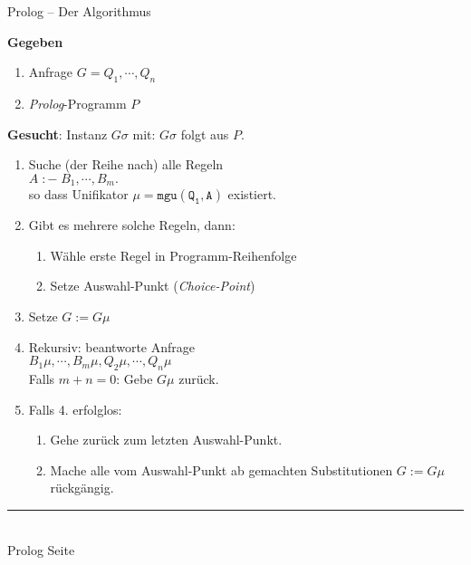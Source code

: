 \documentclass{slides}
\newcommand{\myrule}{\rule{20cm}{1mm}\\ }
\newcounter{mypage}
\begin{document}

\begin{slide}{}
\normalsize
\begin{center}
Prolog -- Der Algorithmus
\end{center}

\footnotesize
\textbf{Gegeben}
\begin{enumerate}
\item Anfrage \hspace*{3.5cm} $G = Q_1, \cdots, Q_n$
\item \textsl{Prolog}-Programm \quad $P$
\end{enumerate}

\textbf{Gesucht}: Instanz $G\sigma$ mit: \quad $G\sigma$ folgt aus $P$.
\begin{enumerate}
\item Suche (der Reihe nach) alle Regeln  \\[0.3cm]      
      \hspace*{1.3cm} $A \;\mathtt{:-}\; B_1,\cdots,B_m.$ \\[0.3cm]
      so dass Unifikator $\mu = \mathtt{mgu(Q_1,A)}$ existiert.
\item Gibt es mehrere solche Regeln, dann:
      \begin{enumerate}
      \item W\"{a}hle erste Regel in Programm-Reihenfolge
      \item Setze Auswahl-Punkt (\emph{Choice-Point})
      \end{enumerate}
\item Setze $G := G\mu$ 
\item Rekursiv: beantworte Anfrage \\[0.3cm]
      \hspace*{1.3cm} $B_1\mu, \cdots, B_m\mu, Q_2\mu, \cdots, Q_n\mu$ \\[0.3cm]
      Falls $m + n = 0$: Gebe $G\mu$ zur\"{u}ck.
\item Falls 4. erfolglos:
      \begin{enumerate}
      \item Gehe zur\"{u}ck zum letzten Auswahl-Punkt.
      \item Mache alle vom Auswahl-Punkt ab gemachten Substitutionen $G := G\mu$ r\"{u}ckg\"{a}ngig.
      \end{enumerate}
\end{enumerate}



\vspace*{\fill}
\tiny \addtocounter{mypage}{1}
\myrule
Prolog  \hspace*{\fill} Seite 
\end{slide}
\end{document}
